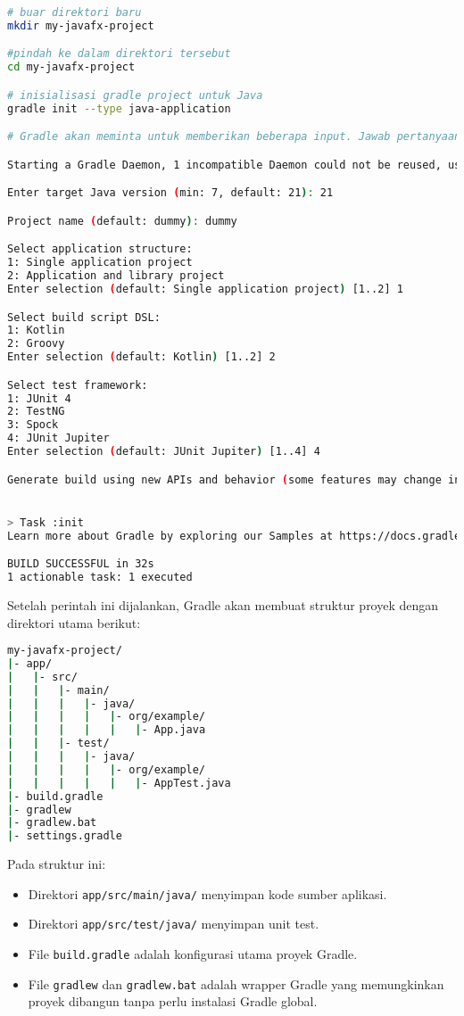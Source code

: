 \begin{lstlisting}[language=bash, caption=Menginisialisasi proyek Gradle]
# buar direktori baru
mkdir my-javafx-project

#pindah ke dalam direktori tersebut
cd my-javafx-project

# inisialisasi gradle project untuk Java
gradle init --type java-application

# Gradle akan meminta untuk memberikan beberapa input. Jawab pertanyaan-pertanyaan tersebut seperti berikut.

Starting a Gradle Daemon, 1 incompatible Daemon could not be reused, use --status for details

Enter target Java version (min: 7, default: 21): 21

Project name (default: dummy): dummy

Select application structure:
1: Single application project
2: Application and library project
Enter selection (default: Single application project) [1..2] 1

Select build script DSL:
1: Kotlin
2: Groovy
Enter selection (default: Kotlin) [1..2] 2

Select test framework:
1: JUnit 4
2: TestNG
3: Spock
4: JUnit Jupiter
Enter selection (default: JUnit Jupiter) [1..4] 4

Generate build using new APIs and behavior (some features may change in the next minor release)? (default: no) [yes, no] no


> Task :init
Learn more about Gradle by exploring our Samples at https://docs.gradle.org/8.13/samples/sample_building_java_applications.html

BUILD SUCCESSFUL in 32s
1 actionable task: 1 executed

\end{lstlisting}

Setelah perintah ini dijalankan, Gradle akan membuat struktur proyek dengan direktori utama berikut:

\begin{lstlisting}[language=bash, caption=Struktur proyek Gradle setelah inisialisasi]
my-javafx-project/
|- app/
|   |- src/
|   |   |- main/
|   |   |   |- java/
|   |   |   |   |- org/example/
|   |   |   |   |   |- App.java
|   |   |- test/
|   |   |   |- java/
|   |   |   |   |- org/example/
|   |   |   |   |   |- AppTest.java
|- build.gradle
|- gradlew
|- gradlew.bat
|- settings.gradle
\end{lstlisting}


Pada struktur ini:
\begin{itemize}
\item Direktori \texttt{app/src/main/java/} menyimpan kode sumber aplikasi.
\item Direktori \texttt{app/src/test/java/} menyimpan unit test.
\item File \texttt{build.gradle} adalah konfigurasi utama proyek Gradle.
\item File \texttt{gradlew} dan \texttt{gradlew.bat} adalah wrapper Gradle yang memungkinkan proyek dibangun tanpa perlu instalasi Gradle global.
\end{itemize}

